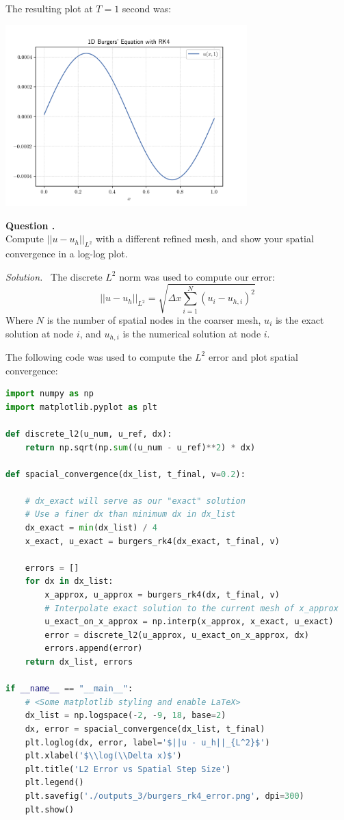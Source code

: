 \documentclass[12pt]{article}
\newcounter{question}
\newcounter{subquest}
\newcommand{\subquestion}[1][true]{
    \stepcounter{subquest} 
    \ifthenelse{\equal{#1}{true} \and \value{subquest}>1}{\newpage}{}
    \vspace{1em}
    \textbf{\large Question \thequestion.\thesubquest}
    \vspace{.5em}\ \\}
\newcommand{\solution}
    {\par\vspace{0.5em}\noindent\emph{Solution.}\ }
    {\par\vspace{1em}}
\begin{document}
\newpage
The resulting plot at $T=1$ second was:
\begin{center}
\includegraphics[width=0.7\textwidth]{../outputs_3/burgers_rk4.png}
\end{center}


\subquestion
Compute $||u-u_h||_{L^2}$ with a different refined 
mesh, and show your spatial convergence in a log-log
plot.

\solution
The discrete $L^2$ norm was used to compute our error:
\[||u - u_h||_{L^2} = \sqrt{\Delta x \sum_{i=1}^{N}(u_i - u_{h,i})^2}\]
Where $N$ is the number of spatial nodes in the coarser mesh, $u_i$ is the exact solution at node $i$, and $u_{h,i}$ is the numerical solution at node $i$.

The following code was used to compute the $L^2$ error and plot spatial convergence:
\begin{lstlisting}[language=Python, caption=3.3 Python]
import numpy as np
import matplotlib.pyplot as plt

def discrete_l2(u_num, u_ref, dx):
    return np.sqrt(np.sum((u_num - u_ref)**2) * dx)

def spacial_convergence(dx_list, t_final, v=0.2):
    
    # dx_exact will serve as our "exact" solution
    # Use a finer dx than minimum dx in dx_list
    dx_exact = min(dx_list) / 4
    x_exact, u_exact = burgers_rk4(dx_exact, t_final, v)
    
    errors = []
    for dx in dx_list:
        x_approx, u_approx = burgers_rk4(dx, t_final, v)
        # Interpolate exact solution to the current mesh of x_approx
        u_exact_on_x_approx = np.interp(x_approx, x_exact, u_exact)
        error = discrete_l2(u_approx, u_exact_on_x_approx, dx)
        errors.append(error)
    return dx_list, errors

if __name__ == "__main__":
    # <Some matplotlib styling and enable LaTeX>
    dx_list = np.logspace(-2, -9, 18, base=2)
    dx, error = spacial_convergence(dx_list, t_final)
    plt.loglog(dx, error, label='$||u - u_h||_{L^2}$')
    plt.xlabel('$\\log(\\Delta x)$')
    plt.title('L2 Error vs Spatial Step Size')
    plt.legend()
    plt.savefig('./outputs_3/burgers_rk4_error.png', dpi=300)
    plt.show()
\end{lstlisting}
\end{document}
